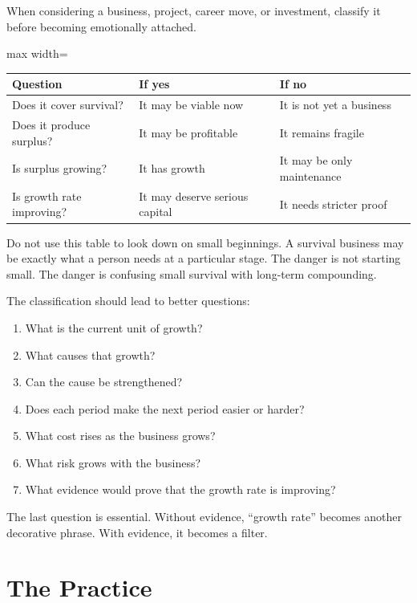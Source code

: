 When considering a business, project, career move, or investment, classify it before becoming emotionally attached.

\begin{center}
\begin{adjustbox}{max width=\linewidth}
\begin{tabular}{lll}
\hline
Question & If yes & If no \\
\hline
Does it cover survival? & It may be viable now & It is not yet a business \\
Does it produce surplus? & It may be profitable & It remains fragile \\
Is surplus growing? & It has growth & It may be only maintenance \\
Is growth rate improving? & It may deserve serious capital & It needs stricter proof \\
\hline
\end{tabular}
\end{adjustbox}
\end{center}

Do not use this table to look down on small beginnings. A survival business may be exactly what a person needs at a particular stage. The danger is not starting small. The danger is confusing small survival with long-term compounding.

The classification should lead to better questions:

\begin{enumerate}
\item What is the current unit of growth?
\item What causes that growth?
\item Can the cause be strengthened?
\item Does each period make the next period easier or harder?
\item What cost rises as the business grows?
\item What risk grows with the business?
\item What evidence would prove that the growth rate is improving?
\end{enumerate}

The last question is essential. Without evidence, ``growth rate'' becomes another decorative phrase. With evidence, it becomes a filter.

\section*{The Practice}

